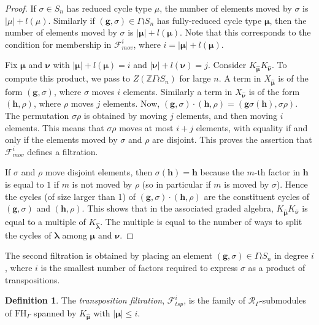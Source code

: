 \documentclass[10pt]{article}
\theoremstyle{definition}
\newtheorem{definition}[theorem]{Definition}
\newcommand{\bs}{\boldsymbol}
\newcommand{\RGamma}{\mathcal{R}_{\Gamma}}
\newcommand{\FHG}{\mathrm{FH}_{\Gamma}}
\begin{document}
\begin{proof}
If $\sigma \in S_n$ has reduced cycle type $\mu$, the number of elements moved by $\sigma$ is $|\mu| + l(\mu)$. Similarly if $(\mathbf{g}, \sigma) \in \Gamma \wr S_n$ has fully-reduced cycle type $\bs\mu$, then the number of elements moved by $\sigma$ is $|\bs \mu| + l(\bs \mu)$. Note that this corresponds to the condition for membership in $\mathcal{F}_{mov}^i$, where $i = |\bs \mu| + l(\bs \mu)$. 

Fix $\bs \mu$ and $\bs \nu$ with $|\bs \mu| + l(\bs \mu) = i$ and $|\bs \nu| + l(\bs \nu) = j$. Consider $K_{\bm\hat{\bs \mu}}K_{\bm\hat{\bs \nu}}$. To compute this product, we pass to $Z(\mathbb{Z}\Gamma \wr S_n)$ for large $n$. A term in $X_{\bm\hat{\bs \mu}}$ is of the form $(\mathbf{g}, \sigma)$, where $\sigma$ moves $i$ elements. Similarly a term in $X_{\bm\hat{\bs \nu}}$ is of the form $(\mathbf{h}, \rho)$, where $\rho$ moves $j$ elements. Now, $(\mathbf{g}, \sigma) \cdot (\mathbf{h}, \rho) = (\mathbf{g}\sigma(\mathbf{h}), \sigma\rho)$. The permutation $\sigma \rho$ is obtained by moving $j$ elements, and then moving $i$ elements. This means that $\sigma \rho$ moves at most $i+j$ elements, with equality if and only if the elements moved by $\sigma$ and $\rho$ are disjoint. This proves the assertion that $\mathcal{F}_{mov}^i$ defines a filtration.

If $\sigma$ and $\rho$ move disjoint elements, then $\sigma(\mathbf{h}) = \mathbf{h}$ because the $m$-th factor in $\mathbf{h}$ is equal to $1$ if $m$ is not moved by $\rho$ (so in particular if $m$ is moved by $\sigma$). Hence the cycles (of size larger than 1) of $(\mathbf{g}, \sigma) \cdot (\mathbf{h}, \rho)$ are the constituent cycles of $(\mathbf{g}, \sigma)$ and $(\mathbf{h}, \rho)$. This shows that in the associated graded algebra, $K_{\bm\hat{\bs \mu}}K_{\bm\hat{\bs \nu}}$ is equal to a multiple of $K_{\bm\hat{\bs \lambda}}$. The multiple is equal to the number of ways to split the cycles of $\bs \lambda$ among $\bs \mu$ and $\bs \nu$.
\end{proof}


The second filtration is obtained by placing an element $(\mathbf{g}, \sigma) \in \Gamma \wr S_n$ in degree $i$, where $i$ is the smallest number of factors required to express $\sigma$ as a product of transpositions. 
\begin{definition}
The \emph{transposition filtration}, $\mathcal{F}_{tsp}^i$, is the family of $\RGamma$-submodules of $\FHG$ spanned by $K_{\bm\hat{\bs \mu}}$ with $|\bs \mu| \leq i$.
\end{definition}
\end{document}

